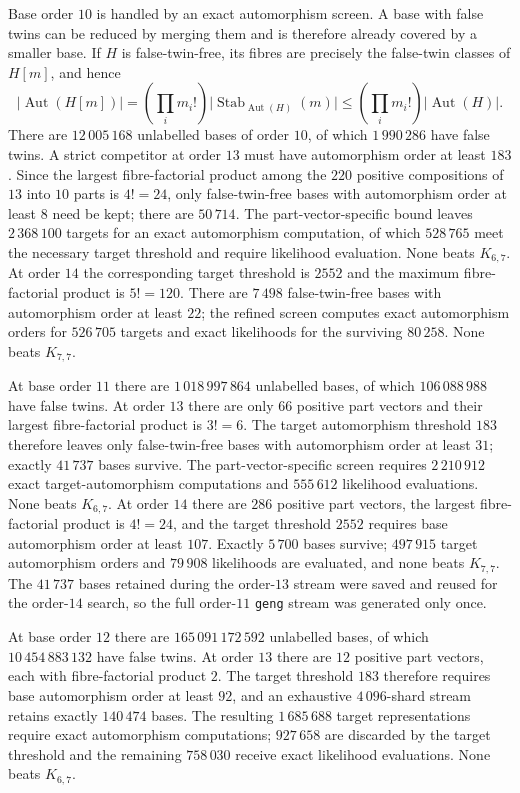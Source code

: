 \documentclass[11pt]{article}
\theoremstyle{definition}
\DeclareMathOperator{\Aut}{Aut}
\begin{document}
Base order $10$ is handled by an exact automorphism screen.  A base with
false twins can be reduced by merging them and is therefore already covered
by a smaller base.  If $H$ is false-twin-free, its fibres are precisely the
false-twin classes of $H[m]$, and hence
\[
\lvert\Aut(H[m])\rvert=\left(\prod_i m_i!\right)
\lvert\operatorname{Stab}_{\Aut(H)}(m)\rvert
\le \left(\prod_i m_i!\right)\lvert\Aut(H)\rvert.
\]
There are $12\,005\,168$ unlabelled bases of order $10$, of which
$1\,990\,286$ have false twins.  A strict competitor at order $13$ must have
automorphism order at least $183$.  Since the largest fibre-factorial product
among the $220$ positive compositions of $13$ into $10$ parts is $4!=24$,
only false-twin-free bases with automorphism order at least $8$ need be kept;
there are $50\,714$.  The part-vector-specific bound leaves $2\,368\,100$
targets for an exact automorphism computation, of which $528\,765$ meet the
necessary target threshold and require likelihood evaluation.  None beats
$K_{6,7}$.  At order $14$ the corresponding target threshold is $2552$ and
the maximum fibre-factorial product is $5!=120$.  There are $7\,498$
false-twin-free bases with automorphism order at least $22$; the refined
screen computes exact automorphism orders for $526\,705$ targets and exact
likelihoods for the surviving $80\,258$.  None beats $K_{7,7}$.

At base order $11$ there are $1\,018\,997\,864$ unlabelled bases, of
which $106\,088\,988$ have false twins.  At order $13$ there are only $66$
positive part vectors and their largest fibre-factorial product is $3!=6$.
The target automorphism threshold $183$ therefore leaves only
false-twin-free bases with automorphism order at least $31$; exactly
$41\,737$ bases survive.  The part-vector-specific screen requires
$2\,210\,912$ exact target-automorphism computations and $555\,612$
likelihood evaluations.  None beats $K_{6,7}$.  At order $14$ there are
$286$ positive part vectors, the largest fibre-factorial product is $4!=24$,
and the target threshold $2552$ requires base automorphism order at least
$107$.  Exactly $5\,700$ bases survive; $497\,915$ target automorphism orders
and $79\,908$ likelihoods are evaluated, and none beats $K_{7,7}$.  The
$41\,737$ bases retained during the order-$13$ stream were saved and reused
for the order-$14$ search, so the full order-$11$ \texttt{geng} stream was
generated only once.

At base order $12$ there are $165\,091\,172\,592$ unlabelled bases, of
which $10\,454\,883\,132$ have false twins.  At order $13$ there are $12$
positive part vectors, each with fibre-factorial product $2$.  The target
threshold $183$ therefore requires base automorphism order at least $92$,
and an exhaustive $4\,096$-shard stream retains exactly $140\,474$ bases.
The resulting $1\,685\,688$ target representations require exact
automorphism computations; $927\,658$ are discarded by the target threshold
and the remaining $758\,030$ receive exact likelihood evaluations.  None
beats $K_{6,7}$.
\end{document}
